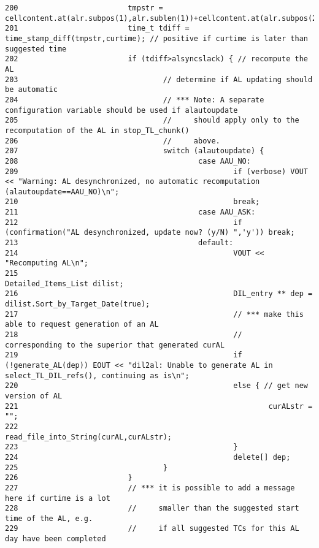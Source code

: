 \begin{verbatim}
200                         tmpstr = cellcontent.at(alr.subpos(1),alr.sublen(1))+cellcontent.at(alr.subpos(2),alr.sublen(2))+cellcontent.at(alr.subpos(3),alr.sublen(3));
201                         time_t tdiff = time_stamp_diff(tmpstr,curtime); // positive if curtime is later than suggested time
202                         if (tdiff>alsyncslack) { // recompute the AL
203                                 // determine if AL updating should be automatic
204                                 // *** Note: A separate configuration variable should be used if alautoupdate
205                                 //     should apply only to the recomputation of the AL in stop_TL_chunk()
206                                 //     above.
207                                 switch (alautoupdate) {
208                                         case AAU_NO:
209                                                 if (verbose) VOUT << "Warning: AL desynchronized, no automatic recomputation (alautoupdate==AAU_NO)\n";
210                                                 break;
211                                         case AAU_ASK:
212                                                 if (confirmation("AL desynchronized, update now? (y/N) ",'y')) break;
213                                         default:
214                                                 VOUT << "Recomputing AL\n";
215                                                 Detailed_Items_List dilist;
216                                                 DIL_entry ** dep = dilist.Sort_by_Target_Date(true);
217                                                 // *** make this able to request generation of an AL
218                                                 //     corresponding to the superior that generated curAL
219                                                 if (!generate_AL(dep)) EOUT << "dil2al: Unable to generate AL in select_TL_DIL_refs(), continuing as is\n";
220                                                 else { // get new version of AL
221                                                         curALstr = "";
222                                                         read_file_into_String(curAL,curALstr);
223                                                 }
224                                                 delete[] dep;
225                                 }
226                         }
227                         // *** it is possible to add a message here if curtime is a lot
228                         //     smaller than the suggested start time of the AL, e.g.
229                         //     if all suggested TCs for this AL day have been completed

\end{verbatim}
